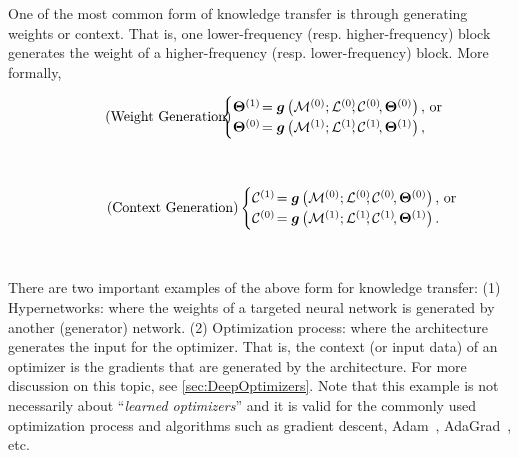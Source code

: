 One of the most common form of knowledge transfer is through generating weights or context. That is, one lower-frequency (resp. higher-frequency) block generates the weight of a higher-frequency (resp. lower-frequency) block. More formally, 


\vspace{-9pt}
\begin{minipage}[t]{0.49\textwidth}
\begin{align}\tag{Weight Generation}
    \hspace*{-2ex}\begin{cases}
        \boldsymbol{\Theta}^{(1)} \!= \boldsymbol{g}\left( \M^{(0)}; \mathcal{L}^{(0)}\!\!, \mathcal{C}^{(0)}\!, \boldsymbol{\Theta}^{(0)} \right), & \!\!\!\!\text{or \:} \hspace*{-1.5ex}  \\ 
    \boldsymbol{\Theta}^{(0)} \!= \boldsymbol{g}\left( \M^{(1)}; \mathcal{L}^{(1)}\!\!, \mathcal{C}^{(1)}\!, \boldsymbol{\Theta}^{(1)} \right),
    \end{cases}
\end{align}
\end{minipage}
\hspace{0.0ex}~
\textcolor{mydarkpurple}{\vline}~
\hspace{-5.5ex}~
\begin{minipage}[t]{0.53\textwidth}
    \begin{align}\tag{Context Generation}
    \begin{cases}
        \mathcal{C}^{(1)} \!= \boldsymbol{g}\left( \M^{(0)}; \mathcal{L}^{(0)}\!\!, \mathcal{C}^{(0)}\!, \boldsymbol{\Theta}^{(0)} \right), & \!\!\!\! \text{or} \hspace*{-3ex} \\ 
    \mathcal{C}^{(0)} \!= \boldsymbol{g}\left( \M^{(1)}; \mathcal{L}^{(1)}\!\!, \mathcal{C}^{(1)}\!, \boldsymbol{\Theta}^{(1)} \right).
    \end{cases}
\end{align}
\end{minipage}
~

There are two important examples of the above form for knowledge transfer: (1) Hypernetworks: where the weights of a targeted neural network is generated by another (generator) network. (2) Optimization process: where the architecture generates the input for the optimizer. That is, the context (or input data) of an optimizer is the gradients that are generated by the architecture. For more discussion on this topic, see \autoref{sec:DeepOptimizers}. Note that this example is not necessarily about ``\emph{learned optimizers}'' and it is valid for the commonly used optimization process and algorithms such as gradient descent, Adam~\citep{kingma2014adam}, AdaGrad~\citep{duchi2011adaptive}, etc.   


